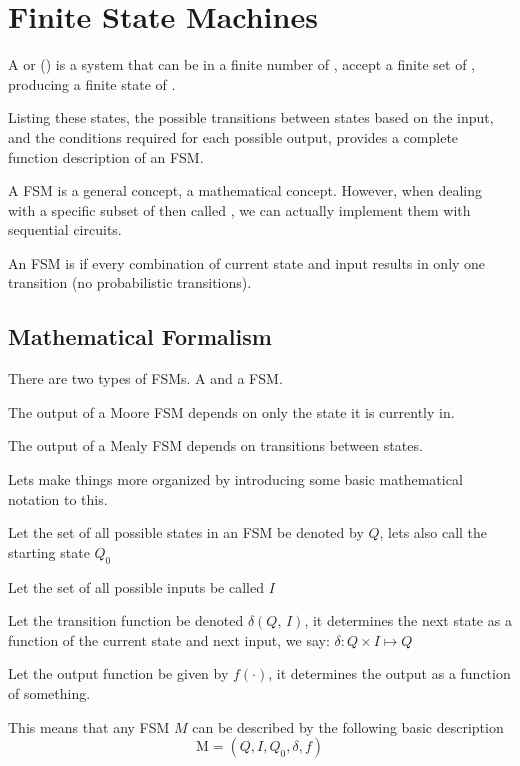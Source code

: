 \chapter{Finite State Machines}

A  or () is a system that can be in a finite number of , accept a finite set of , producing a finite state of .
\begin{bullets}
	\item Listing these states, the possible transitions between states based on the input, and the conditions required for each possible output, provides a complete function description of an FSM.
\end{bullets}

A FSM is a general concept, a mathematical concept. However, when dealing with a specific subset of then called , we can actually implement them with sequential circuits.
\begin{bullets}
	\item An FSM is  if every combination of current state and input results in only one transition (no probabilistic transitions).
\end{bullets}

\section{Mathematical Formalism}

There are two types of FSMs. A  and a  FSM. 
\begin{bullets}
	\item The output of a Moore FSM depends on only the state it is currently in.
	\item The output of a Mealy FSM depends on transitions between states.
\end{bullets}

Lets make things more organized by introducing some basic mathematical notation to this.
\begin{bullets}
	\item Let the set of all possible states in an FSM be denoted by $Q$, lets also call the starting state $Q_0$
	\item Let the set of all possible inputs be called $I$
	\item Let the transition function be denoted $\delta(Q,\,I)$, it determines the next state as a function of the current state and next input, we say: $\delta : Q \times I \mapsto Q$
	\item Let the output function be given by $f(\cdot)$, it determines the output as a function of something.
\end{bullets}
This means that any FSM $M$ can be described by the following basic description
\[	\text{M} = \left(  Q, I, Q_0, \delta, f \right)	\]

